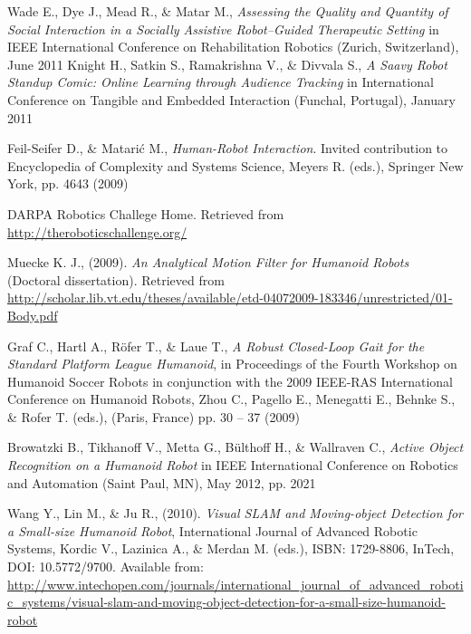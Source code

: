 \begin{thebibliography}{99}

	Wade E., Dye J., Mead R., \& Matar M.,
	\emph{Assessing the Quality and Quantity of Social Interaction in a Socially Assistive Robot{--}Guided Therapeutic Setting}
	in IEEE International Conference on Rehabilitation Robotics
	(Zurich, Switzerland),
	June 2011
	Knight H., Satkin S., Ramakrishna V., \& Divvala S.,
	\emph{A Saavy Robot Standup Comic{:} Online Learning through Audience Tracking}
	in International Conference on Tangible and Embedded Interaction
	(Funchal, Portugal),
	January 2011

	Feil-Seifer D., \& Matari\'{c} M.,
	\emph{Human-Robot Interaction}. 
	Invited contribution to Encyclopedia of Complexity and Systems Science,
	Meyers R. (eds.),
	Springer New York,
	pp. 4643
	(2009) 

	DARPA Robotics Challege Home.
	Retrieved from \url{http://theroboticschallenge.org/}

	Muecke K. J.,
	(2009).
	\emph{An Analytical Motion Filter for Humanoid Robots}
	(Doctoral dissertation).
	Retrieved from
	\url{http://scholar.lib.vt.edu/theses/available/etd-04072009-183346/unrestricted/01-Body.pdf}

	Graf C., Hartl A., R\"{o}fer T., \& Laue T., 
	\emph{A Robust Closed-Loop Gait for the Standard Platform League Humanoid},
	in Proceedings of the Fourth Workshop on Humanoid Soccer Robots 
	in conjunction with the 2009 IEEE-RAS International Conference on Humanoid Robots, 
	Zhou C., Pagello E., Menegatti E., Behnke S., \& Rofer T. (eds.), 
	(Paris, France)
	pp. 30 – 37
	(2009)

	Browatzki B., Tikhanoff V., Metta G., B\"{u}lthoff H., \& Wallraven C.,
	\emph{Active Object Recognition on a Humanoid Robot}
	in IEEE International Conference on Robotics and Automation
	(Saint Paul, MN),
	May 2012,
	pp. 2021

	Wang Y., Lin M., \& Ju R.,
	(2010). 
	\emph{Visual SLAM and Moving-object Detection for a Small-size Humanoid Robot}, 
	International Journal of Advanced Robotic Systems, 
	Kordic V., Lazinica A., \& Merdan M. (eds.), 
	ISBN: 1729-8806, 
	InTech, DOI: 10.5772/9700. 
	Available from: \url{http://www.intechopen.com/journals/international_journal_of_advanced_robotic_systems/visual-slam-and-moving-object-detection-for-a-small-size-humanoid-robot}


\end{thebibliography}

